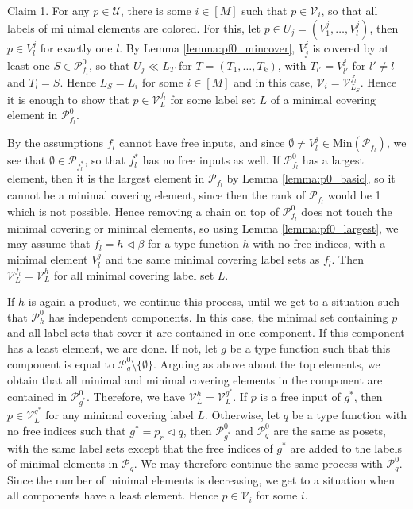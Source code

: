 \documentclass[12pt]{article}
\theoremstyle{definition}
\theoremstyle{remark}
\def\cover{\ll}
\def\Pe{\mathcal P}
\def\vtl{\vartriangleleft}
\begin{document}
Claim 1. For  any $p\in \mathcal U$, there is some $i\in [M]$ such that $p\in \mathcal
V_i$, so that all labels of mi nimal elements are colored. For this, 
let $p\in U_j=(V^j_1,\dots, V_l^j)$, then $p\in V^j_l$ for exactly one
$l$. By Lemma \ref{lemma:pf0_mincover}, $V^j_j$ is
covered by at least one $S\in \Pe_{f_l}^0$, so that $U_j\cover L_{T}$ for
$T=(T_1,\dots, T_k)$, with $T_{l'}=V^j_{l'}$ for $l'\ne l$ and $T_l=S$. Hence $L_S=L_i$  for some $i\in [M]$
and in this case, $\mathcal V_i=\mathcal V_{L_S}^{f_l}$.
 Hence it is enough
to show that $p\in \mathcal V_L^{f_l}$ for some label set  $L$ of a  minimal covering element
in $\Pe_{f_l}^0$.  

By the assumptions $f_l$ cannot have free inputs, and since $\emptyset\ne V_l^j\in
\mathrm{Min}(\Pe_{f_l})$, we see that $\emptyset \in \Pe_{f_l^*}$, so that $f_l^*$
has no free inputs as well. If $\Pe_{f_l}^0$ has a largest element,
then it is the largest element in $\Pe_{f_l}$ by Lemma \ref{lemma:p0_basic}, so it cannot be a
minimal covering element, since then the rank of $\Pe_{f_l}$ would be 1 which is not
possible. Hence removing a chain on top of $\Pe_{f_l}^0$ does not touch the minimal
covering or minimal elements, so using Lemma \ref{lemma:pf0_largest}, we  may assume that 
$f_l=h\vtl \beta$ for a type function $h$ with no free indices, with a minimal element
$V^j_l$ and the same minimal covering label sets as $f_l$. Then $\mathcal
V^{f_l}_L=\mathcal V^h_L$ for all minimal covering label set $L$.

If $h$ is again a product, we
continue this process, until we get to a situation such that $\Pe_h^0$ has independent
components. In this case,  the minimal set containing $p$ and all label sets that cover it  are contained in one
component. If this component has a least element,  we are done. If not, let $g$ be a type function such that this
component is equal to $\Pe_g^0\setminus \{\emptyset\}$. Arguing as above about the top
elements, we obtain that all minimal and minimal covering elements in the component are
contained in $\Pe_{g^*}^0$. Therefore, we have $\mathcal V^h_L=\mathcal V^{g^*}_L$. 
If $p$ is a free input of $g^*$, then $p\in \mathcal
V^{g^*}_L$ for any minimal covering label $L$. Otherwise, let $q$ be a type function with
no free indices such that $g^*=p_r\vtl q$, then $\Pe_{g^*}^0$ and  $\Pe_q^0$ are the
same as posets, with the same label sets except that the free indices of $g^*$ are added
to the labels of minimal elements in $\Pe_q$. We may therefore continue the same process
with $\Pe_q^0$. Since the number of minimal elements is decreasing, we get to a situation 
when all components have a least element. Hence $p\in \mathcal V_i$ for some $i$. 
\end{document}
